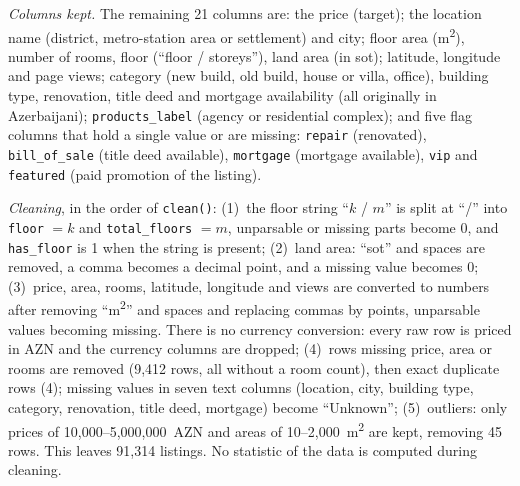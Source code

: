 \documentclass[10pt,twocolumn,a4paper]{article}
\begin{document}
\textit{Columns kept.} The remaining 21 columns are: %
the price (target); the location name (district, metro-station area or
settlement) and city; floor area (m\textsuperscript{2}), number of rooms,
floor (``floor / storeys''), land area (in sot); latitude, longitude and
page views; category (new build, old build, house or villa, office),
building type, renovation, title deed and mortgage availability (all
originally in Azerbaijani); \texttt{products\_label} (agency or
residential complex); and five flag columns that hold a single value or
are missing: \texttt{repair} (renovated), \texttt{bill\_of\_sale} (title
deed available), \texttt{mortgage} (mortgage available), \texttt{vip} and
\texttt{featured} (paid promotion of the listing).

\textit{Cleaning}, in the order of \texttt{clean()}: %
(1)~the floor string ``$k$ / $m$'' is split at ``/'' into \texttt{floor}
$=k$ and \texttt{total\_floors} $=m$, unparsable or missing parts become
0, and \texttt{has\_floor} is 1 when the string is present; %
(2)~land area: ``sot'' and spaces are removed, a comma becomes a decimal
point, and a missing value becomes 0; %
(3)~price, area, rooms, latitude, longitude and views are converted to
numbers after removing ``m\textsuperscript{2}'' and spaces and replacing
commas by points, unparsable values becoming missing. %
There is no currency conversion: every raw row is priced in AZN %
and the currency columns are dropped; %
(4)~rows missing price, area or rooms are removed (9{,}412 rows, all %
without a room count), %
then exact duplicate rows (4); %
missing values in seven text columns (location, city, building type,
category, renovation, title deed, mortgage) become ``Unknown''; %
(5)~outliers: only prices of 10{,}000--5{,}000{,}000~AZN and areas of
10--2{,}000~m\textsuperscript{2} are kept, %
removing 45 rows. %
This leaves 91{,}314 listings. %
No statistic of the data is computed during cleaning.
\end{document}

